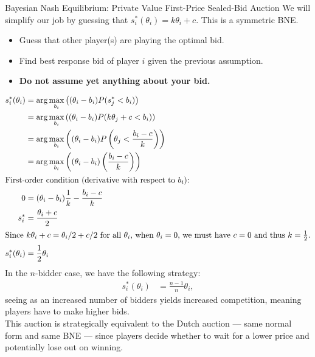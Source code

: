 \documentclass[10pt]{extarticle}
\begin{document}
\begin{problem}{Bayesian Nash Equilibrium: Private Value First-Price Sealed-Bid Auction}
    We will simplify our job by guessing that $s_i^{\ast}(\theta_i) = k\theta_i + c$. This is a symmetric BNE.
    \begin{itemize}
      \item Guess that other player(s) are playing the optimal bid.
      \item Find best response bid of player $i$ given the previous assumption.
      \item \textbf{Do not assume yet anything about your bid.}
    \end{itemize}
    \begin{align*}
      s_i^{\ast}(\theta_i) &= \arg\max_{b_i}\left((\theta_i-b_i)P(s_{j}^{\ast} < b_i)\right)\\
                           &= \arg\max_{b_i}\left((\theta_i - b_i)P(k\theta_j + c < b_i)\right)\\
                           &= \arg\max_{b_i}\left((\theta_i - b_i)P\left(\theta_j < \frac{b_i-c}{k}\right)\right)\\
                           &= \arg\max_{b_i}\left((\theta_i - b_i)\left(\frac{b_i-c}{k}\right)\right)\\
     \shortintertext{First-order condition (derivative with respect to $b_i$):}
      0 &= (\theta_i - b_i) \frac{1}{k} - \frac{b_i - c}{k}\\
      s_{i}^{\ast} &= \frac{\theta_i+c}{2}\\
      \shortintertext{Since $k\theta_i + c = \theta_i/2 + c/2$ for all $\theta_i$, when $\theta_i = 0$, we must have $c = 0$ and thus $k = \frac{1}{2}$.}
      s_{i}^{\ast}(\theta_i) &= \frac{1}{2}\theta_i
    \end{align*}
    In the $n$-bidder case, we have the following strategy:
    \begin{align*}
      s_{i}^{\ast}(\theta_i) &= \frac{n-1}{n}\theta_i,
    \end{align*}
    seeing as an increased number of bidders yields increased competition, meaning players have to make higher bids.\\
    
    This auction is strategically equivalent to the Dutch auction --- same normal form and same BNE --- since players decide whether to wait for a lower price and potentially lose out on winning.
  \end{problem}
\end{document}
